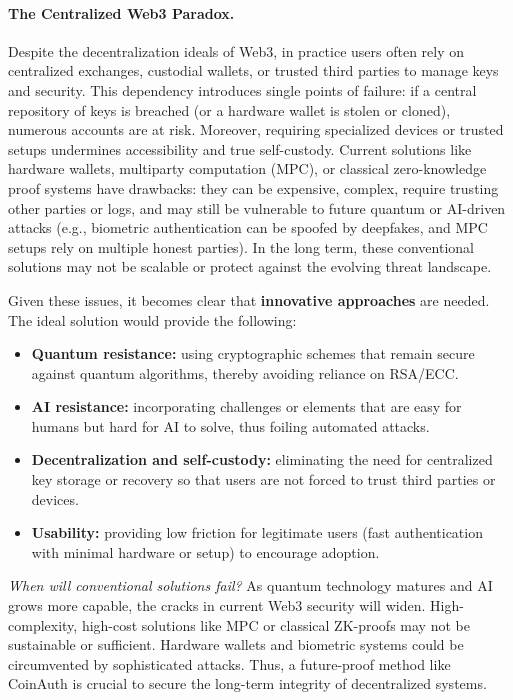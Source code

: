 \documentclass[10pt,letterpaper]{article}
\begin{document}
\paragraph{The Centralized Web3 Paradox.} Despite the decentralization ideals of Web3, in practice users often rely on centralized exchanges, custodial wallets, or trusted third parties to manage keys and security. This dependency introduces single points of failure: if a central repository of keys is breached (or a hardware wallet is stolen or cloned), numerous accounts are at risk. Moreover, requiring specialized devices or trusted setups undermines accessibility and true self-custody. Current solutions like hardware wallets, multiparty computation (MPC), or classical zero-knowledge proof systems have drawbacks: they can be expensive, complex, require trusting other parties or logs, and may still be vulnerable to future quantum or AI-driven attacks (e.g., biometric authentication can be spoofed by deepfakes, and MPC setups rely on multiple honest parties). In the long term, these conventional solutions may not be scalable or protect against the evolving threat landscape.

Given these issues, it becomes clear that \textbf{innovative approaches} are needed. The ideal solution would provide the following:
\begin{itemize}
    \item \textbf{Quantum resistance:} using cryptographic schemes that remain secure against quantum algorithms, thereby avoiding reliance on RSA/ECC.
    \item \textbf{AI resistance:} incorporating challenges or elements that are easy for humans but hard for AI to solve, thus foiling automated attacks.
    \item \textbf{Decentralization and self-custody:} eliminating the need for centralized key storage or recovery so that users are not forced to trust third parties or devices.
    \item \textbf{Usability:} providing low friction for legitimate users (fast authentication with minimal hardware or setup) to encourage adoption.
\end{itemize}

\noindent \emph{When will conventional solutions fail?} As quantum technology matures and AI grows more capable, the cracks in current Web3 security will widen. High-complexity, high-cost solutions like MPC or classical ZK-proofs may not be sustainable or sufficient. Hardware wallets and biometric systems could be circumvented by sophisticated attacks. Thus, a future-proof method like CoinAuth is crucial to secure the long-term integrity of decentralized systems.
\end{document}
